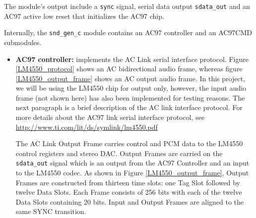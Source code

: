 				The module's output include a \texttt{sync} signal, serial data output \texttt{sdata\_out} and an AC97 active low reset that initializes the AC97 chip. 
				
				Internally, the \texttt{snd\_gen\_c} module contains an AC97 controller and an AC97CMD submodules.
				\begin{itemize}
				\item \textbf{AC97 controller:} implements the AC Link serial interface protocol. Figure \ref{LM4550_protocol} shows an AC bidirectional audio frame, whereas figure \ref{LM4550_output_frame} shows an AC output audio frame. In this project, we will be using the LM4550 chip for output only, however, the input audio frame (not shown here) has also been implemented for testing reasons. The next paragraph is a brief description of the AC link interface protocol. For more details about the AC97 link serial interface protocol, see \url{http://www.ti.com/lit/ds/symlink/lm4550.pdf}
				
				The AC Link Output Frame carries control and PCM data to the LM4550 control registers and stereo DAC. Output Frames are carried on the \texttt{sdata\_out} signal which is an output from the AC97 Controller and an input to the LM4550 codec. As shown in Figure \ref{LM4550_output_frame}, Output Frames are constructed from thirteen time slots: one Tag Slot followed by twelve Data Slots. Each Frame consists of 256 bits with each of the twelve Data Slots containing 20 bits. Input and Output Frames are aligned to the same SYNC transition.
				
				
			\begin{figure}
			

\end{figure}
\end{itemize}
